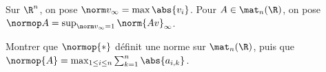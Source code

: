 \begin{enonce}
\begin{exercise}[ID={RMS 122 E855},subtitle={},tags={}, difficulty={0}]
  Sur $\R^n$, on pose $\norm v_\infty=\max\abs{v_i}$.
  Pour $A\in\mat_n(\R)$, on pose $\normop A=\sup_{\norm v_\infty=1} \norm{ Av}_\infty$.

  Montrer que $\normop{*}$ définit une norme sur $\mat_n(\R)$, puis que $\normop{A}=\max_{1\leq i\leq n} \sum_{k=1}^n \abs{a_{i,k}}$.
\end{exercise}
\begin{solution}
\end{solution}
\end{enonce}

